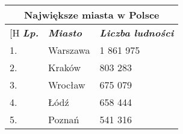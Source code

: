 \begin{table}[]
\begin{tabular}{|lll|}
\hline
\multicolumn{3}{|c|}{\textbf{Największe miasta w Polsce}}                                                                                                                     \\ \hline
\multicolumn{1}{|l|}{{\color[H \textit{\textbf{Lp.}}}} & \multicolumn{1}{l|}{{\color[HTML]{000000} \textit{\textbf{Miasto}}}} & {\color[HTML]{000000} \textit{\textbf{Liczba ludności}}} \\ \hline
\multicolumn{1}{|l|}{{\color[HTML]{000000} 1.}}                    & \multicolumn{1}{l|}{{\color[HTML]{000000} Warszawa}}                 & {\color[HTML]{000000} 1 861 975}                         \\ \hline
\multicolumn{1}{|l|}{{\color[HTML]{000000} 2.}}                    & \multicolumn{1}{l|}{{\color[HTML]{000000} Kraków}}                   & {\color[HTML]{000000} 803 283}                           \\ \hline
\multicolumn{1}{|l|}{{\color[HTML]{000000} 3.}}                    & \multicolumn{1}{l|}{{\color[HTML]{000000} Wrocław}}                  & {\color[HTML]{000000} 675 079}                           \\ \hline
\multicolumn{1}{|l|}{{\color[HTML]{000000} 4.}}                    & \multicolumn{1}{l|}{{\color[HTML]{000000} Łódź}}                     & {\color[HTML]{000000} 658 444}                           \\ \hline
\multicolumn{1}{|l|}{{\color[HTML]{000000} 5.}}                    & \multicolumn{1}{l|}{{\color[HTML]{000000} Poznań}}                   & {\color[HTML]{000000} 541 316}                           \\ \hline
\end{tabular}
\end{table}
